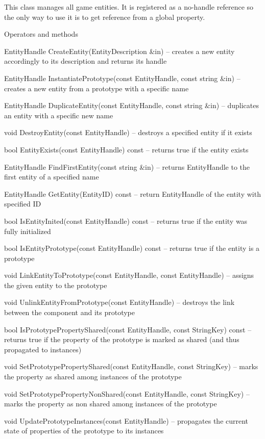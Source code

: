 This class manages all game entities. It is registered as a no-handle reference so the only way to use it is to get reference from a global property.

\begin{titled-itemize}{Operators and methods}
  \item EntityHandle CreateEntity(EntityDescription \&in) -- creates a new entity accordingly to its description and returns its handle
  \item EntityHandle InstantiatePrototype(const EntityHandle, const string \&in) -- creates a new entity from a prototype with a specific name
  \item EntityHandle DuplicateEntity(const EntityHandle, const string \&in) -- duplicates an entity with a specific new name
  \item void DestroyEntity(const EntityHandle) -- destroys a specified entity if it exists
  \item bool EntityExists(const EntityHandle) const -- returns true if the entity exists
  \item EntityHandle FindFirstEntity(const string \&in) -- returns EntityHandle to the first entity of a specified name
  \item EntityHandle GetEntity(EntityID) const -- return EntityHandle of the entity with specified ID
  \item bool IsEntityInited(const EntityHandle) const -- returns true if the entity was fully initialized
  \item bool IsEntityPrototype(const EntityHandle) const -- returns true if the entity is a prototype
  \item void LinkEntityToPrototype(const EntityHandle, const EntityHandle) -- assigns the given entity to the prototype
  \item void UnlinkEntityFromPrototype(const EntityHandle) -- destroys the link between the component and its prototype
  \item bool IsPrototypePropertyShared(const EntityHandle, const String\-Key) const -- returns true if the property of the prototype is marked as shared (and thus propagated to instances)
  \item void SetPrototypePropertyShared(const EntityHandle, const String\-Key) -- marks the property as shared among instances of the prototype
  \item void SetPrototypePropertyNonShared(const EntityHandle, const String\-Key) -- marks the property as non shared among instances of the prototype
  \item void UpdatePrototypeInstances(const EntityHandle) -- propagates the current state of properties of the prototype to its instances

\end{titled-itemize}

